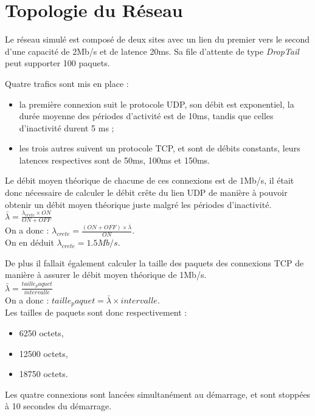 
\section{Topologie du R\'eseau}

Le r\'eseau simul\'e est compos\'e de deux sites avec un lien du premier vers le second
d'une capacit\'e de 2Mb/s et de latence 20ms.
Sa file d'attente de type {\em DropTail} peut supporter 100 paquets.

Quatre trafics sont mis en place :
\begin{itemize}
	\item la premi\`ere connexion suit le protocole UDP, son d\'ebit est exponentiel, la
	dur\'ee moyenne des p\'eriodes d'activit\'e est de 10ms, tandis que celles
	d'inactivit\'e durent 5 ms ;
	\item les trois autres suivent un protocole TCP, et sont de d\'ebits constants, leurs
	latences respectives sont de 50ms, 100ms et 150ms.
\end{itemize}

Le débit moyen théorique de chacune de ces connexions est de 1Mb/s, il était donc
nécessaire de calculer le débit crête du lien UDP de manière à pouvoir obtenir un débit
moyen théorique juste malgré les périodes d'inactivité.\\
$\bar{\lambda} = \frac{\lambda_{crete} \times ON}{ON + OFF}$\\
On a donc : $\lambda_{crete} = \frac{(ON + OFF) \times \bar{\lambda}}{ON}$.\\
On en déduit $\lambda_{crete} = 1.5 Mb/s$.

De plus il fallait également calculer la taille des paquets des connexions TCP de manière
à assurer le débit moyen théorique de 1Mb/s.\\
$\bar{\lambda} = \frac{taille_paquet}{intervalle}$\\
On a donc : $taille_paquet = \bar{\lambda} \times intervalle$.\\
Les tailles de paquets sont donc respectivement :
\begin{itemize}
	\item 6250 octets,
	\item 12500 octets,
	\item 18750 octets.
\end{itemize}

Les quatre connexions sont lancées simultanément au démarrage, et sont stoppées à 10
secondes du démarrage.

